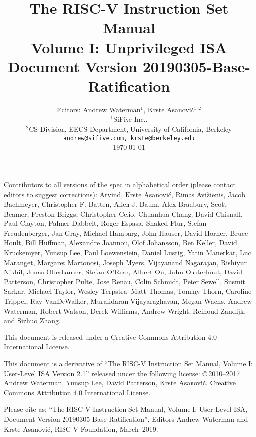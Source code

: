 \documentclass[twoside,11pt]{book}
\newcommand{\specrev}{\mbox{20190305-Base-Ratification}}
\newcommand{\specmonthyear}{\mbox{March 2019}}
\begin{document}
\title{\vspace{-0.7in}\Large {\bf The RISC-V Instruction Set Manual} \\
  \large {\bf Volume I: Unprivileged ISA} \\
  Document Version \specrev
  \vspace{-0.1in}}

\author{Editors: Andrew Waterman$^{1}$, Krste Asanovi\'{c}$^{1,2}$ \\
  $^{1}$SiFive Inc., \\
  $^{2}$CS Division, EECS Department, University of California, Berkeley \\
  {\tt andrew@sifive.com, krste@berkeley.edu} \\
  \today
}
\date{} 
\maketitle

Contributors to all versions of the spec in
alphabetical order (please contact editors to suggest
corrections):
Arvind, Krste Asanovi\'{c}, Rimas Avi\v{z}ienis, Jacob Bachmeyer, Christopher
F. Batten, Allen J. Baum, Alex Bradbury, Scott Beamer, Preston Briggs,
Christopher Celio, Chuanhua Chang, David Chisnall, Paul Clayton, Palmer
Dabbelt, Roger Espasa, Shaked Flur, Stefan Freudenberger, Jan Gray, Michael
Hamburg, John Hauser, David Horner, Bruce Hoult, Bill Huffman, Alexandre Joannou,
Olof Johansson, Ben Keller, David Kruckemyer, Yunsup Lee,
Paul Loewenstein, Daniel Lustig, Yatin Manerkar, Luc Maranget, Margaret
Martonosi, Joseph Myers, Vijayanand Nagarajan, Rishiyur Nikhil, Jonas
Oberhauser, Stefan O'Rear, Albert Ou, John Ousterhout, David Patterson,
Christopher Pulte, Jose Renau, Colin Schmidt, Peter Sewell, Susmit Sarkar,
Michael Taylor, Wesley Terpstra, Matt Thomas, Tommy Thorn, Caroline Trippel,
Ray VanDeWalker, Muralidaran Vijayaraghavan, Megan Wachs, Andrew Waterman,
Robert Watson, Derek Williams, Andrew Wright, Reinoud Zandijk, and Sizhuo
Zhang.

This document is released under a Creative Commons Attribution 4.0
International License.

This document is a derivative of ``The RISC-V Instruction Set
Manual, Volume I: User-Level ISA Version 2.1'' released under the following license:
\copyright \,2010--2017 Andrew Waterman, Yunsup Lee, David Patterson, Krste Asanovi\'{c}. 
Creative Commons Attribution 4.0 International License.

Please cite as: ``The RISC-V Instruction Set
Manual, Volume I: User-Level ISA, Document Version \specrev'', Editors
Andrew Waterman and Krste Asanovi\'{c}, RISC-V Foundation, \specmonthyear.
\end{document}
